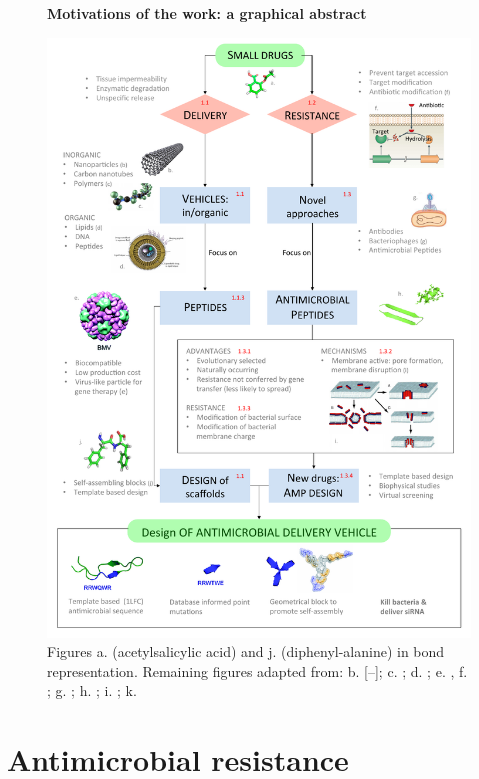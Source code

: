 \begin{figure}
\begin{center}
\Large{\textbf{Motivations of the work: a graphical abstract}}\par\bigskip
\includegraphics[width = \textwidth]{1introduction/pics/scheme_intro}
\caption[Graphical abstract of introduction]{Figures a. (acetylsalicylic acid) and j. (diphenyl-alanine) in bond representation. Remaining figures adapted from: b. [--]; c. \cite{poly}; d. \cite{lipo}; e. \cite{Schoonen2014}, f. \cite{Blair2014}; g. \cite{phage}; h. \cite{Torres2019}; i. \cite{Nguyen2011}; k. \cite{Castelletto2016}} \label{fig:intro}
\end{center}
\end{figure}

\clearpage

\section{Antimicrobial resistance}

